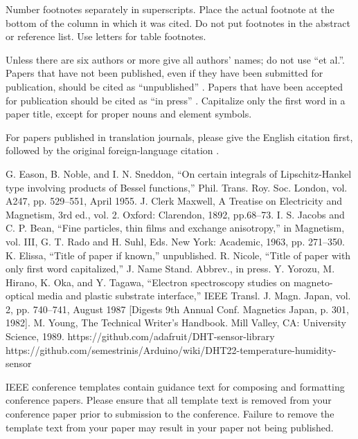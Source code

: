 \documentclass[conference]{IEEEtran}
\begin{document}
Number footnotes separately in superscripts. Place the actual footnote at 
the bottom of the column in which it was cited. Do not put footnotes in the 
abstract or reference list. Use letters for table footnotes.

Unless there are six authors or more give all authors' names; do not use 
``et al.''. Papers that have not been published, even if they have been 
submitted for publication, should be cited as ``unpublished'' \cite{b4}. Papers 
that have been accepted for publication should be cited as ``in press'' \cite{b5}. 
Capitalize only the first word in a paper title, except for proper nouns and 
element symbols.

For papers published in translation journals, please give the English 
citation first, followed by the original foreign-language citation \cite{b6}.

\begin{thebibliography}{00}
 G. Eason, B. Noble, and I. N. Sneddon, ``On certain integrals of Lipschitz-Hankel type involving products of Bessel functions,'' Phil. Trans. Roy. Soc. London, vol. A247, pp. 529--551, April 1955.
 J. Clerk Maxwell, A Treatise on Electricity and Magnetism, 3rd ed., vol. 2. Oxford: Clarendon, 1892, pp.68--73.
 I. S. Jacobs and C. P. Bean, ``Fine particles, thin films and exchange anisotropy,'' in Magnetism, vol. III, G. T. Rado and H. Suhl, Eds. New York: Academic, 1963, pp. 271--350.
 K. Elissa, ``Title of paper if known,'' unpublished.
 R. Nicole, ``Title of paper with only first word capitalized,'' J. Name Stand. Abbrev., in press.
 Y. Yorozu, M. Hirano, K. Oka, and Y. Tagawa, ``Electron spectroscopy studies on magneto-optical media and plastic substrate interface,'' IEEE Transl. J. Magn. Japan, vol. 2, pp. 740--741, August 1987 [Digests 9th Annual Conf. Magnetics Japan, p. 301, 1982].
 M. Young, The Technical Writer's Handbook. Mill Valley, CA: University Science, 1989.
 https://github.com/adafruit/DHT-sensor-library
 https://github.com/semestrinis/Arduino/wiki/DHT22-temperature-humidity-sensor

\end{thebibliography}
\vspace{12pt}
\color{red}
IEEE conference templates contain guidance text for composing and formatting conference papers. Please ensure that all template text is removed from your conference paper prior to submission to the conference. Failure to remove the template text from your paper may result in your paper not being published.
\end{document}
